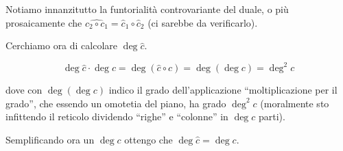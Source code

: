 	Notiamo innanzitutto la funtorialità controvariante del duale, o più prosaicamente che $\hat{c_2 \circ c_1} = \hat c_1 \circ \hat c_2$ (ci sarebbe da verificarlo).

	Cerchiamo ora di calcolare $\deg \hat c$.
	
	\[
		\deg \hat c \cdot \deg c = \deg(\hat c \circ c) = \deg(\deg c) = \deg^2 c
	\]
	
	dove con $\deg(\deg c)$ indico il grado dell'applicazione ``moltiplicazione per il grado'', che essendo un omotetia del piano, ha grado $\deg^2 c$ (moralmente sto infittendo il reticolo dividendo ``righe'' e ``colonne'' in $\deg c$ parti).
	
	Semplificando ora un $\deg c$ ottengo che $\deg \hat c = \deg c$.

